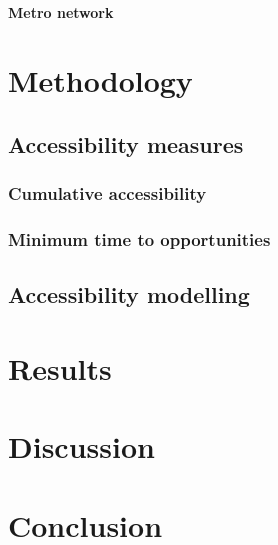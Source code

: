 \documentclass[12pt, a4paper]{report}
\begin{document}
\subsubsection{Metro network}



\chapter{Methodology} \label{Chap4}

\section{Accessibility measures}

\subsection{Cumulative accessibility}

\subsection{Minimum time to opportunities}

\section{Accessibility modelling}

\chapter{Results} \label{Chap5}
\chapter{Discussion} \label{Chap6}
\chapter{Conclusion} \label{Chap7}
\end{document}
